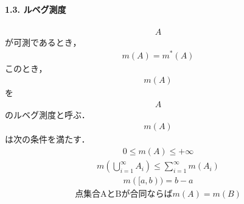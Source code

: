 \documentclass[letterpaper,10pt,english]{sphinxmanual}
\begin{document}
\paragraph{1.3. ルベグ測度}
\label{\detokenize{src/stochasticcalculus/2020-03-16-lebesgue:id7}}\begin{equation*}
\begin{split}A\end{split}
\end{equation*}
\sphinxAtStartPar
が可測であるとき，
\begin{equation*}
\begin{split}\begin{equation}
m(A) = m^{\ast}(A)
\end{equation}\end{split}
\end{equation*}
\sphinxAtStartPar
このとき，
\begin{equation*}
\begin{split}m(A)\end{split}
\end{equation*}
\sphinxAtStartPar
を
\begin{equation*}
\begin{split}A\end{split}
\end{equation*}
\sphinxAtStartPar
のルベグ測度と呼ぶ．
\begin{equation*}
\begin{split}m(A)\end{split}
\end{equation*}
\sphinxAtStartPar
は次の条件を満たす．
\begin{equation*}
\begin{split}\begin{equation}
0 \leq m(A) \leq +\infty
\label{eq:131}\tag{L1}
\end{equation}\end{split}
\end{equation*}\begin{equation*}
\begin{split}\begin{equation}
m\left(\bigcup_{i=1}^{\infty} A_{i}\right) \leq \sum_{i=1}^{\infty} m\left(A_{i}\right)
\label{eq:132}\tag{L2}
\end{equation}\end{split}
\end{equation*}\begin{equation*}
\begin{split}\begin{equation}
m([a,b)) = b-a
\label{eq:133}\tag{L3}
\end{equation}\end{split}
\end{equation*}\begin{equation*}
\begin{split}\begin{equation}
\text{点集合AとBが合同ならば} m(A) = m(B)
\label{eq:134}\tag{L4}
\end{equation}\end{split}
\end{equation*}
\end{document}
